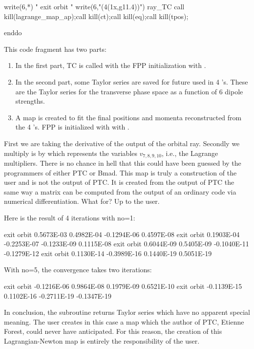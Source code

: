 \documentclass{hitec}     %
\begin{document}
{{\begin{code}
   write(6,*) " exit orbit " 
   write(6,"(4(1x,g11.4))") ray_TC%
   call kill(lagrange_map_ap);call kill(ct);call kill(eq);call kill(tpos);

enddo
\end{code}

This code fragment has two parts:
\begin{enumerate}
\item\label{itf1} In the  first part, TC is called with the FPP initialization  with . 
\item\label{itf2}  In the  second part,  some Taylor series are saved for future used in 4 's. These are the Taylor series for the transverse phase space as a function of 6 dipole strengths.
\item\label{itf3}  A map is created to fit the final positions and momenta reconstructed from the  4 's. FPP is initialized with with . 
\end{enumerate}



First we are taking the derivative of the output of the orbital ray.  
 Secondly we multiply is by  which represents the variables $v_{7,8,9,10}$, i.e., the Lagrange multipliers. There is no chance in hell that this could have been guessed by the  programmers of either PTC or Bmad. This map is truly a construction of the user and is not the output of PTC. It is created from the output of PTC the same way a matrix can be computed from the output of an ordinary  code via numerical differentiation.  What for? Up to the user.
 

Here is the result of 4 iterations with no=1:
\renewcommand{\codefont}{\footnotesize}
\begin{code}
  exit orbit
  0.5673E-03  0.4982E-04 -0.1294E-06  0.4597E-08
  exit orbit
  0.1903E-04 -0.2253E-07 -0.1233E-09  0.1115E-08
  exit orbit
  0.6044E-09  0.5405E-09 -0.1040E-11 -0.1279E-12
  exit orbit
  0.1130E-14 -0.3989E-16  0.1440E-19  0.5051E-19
  \end{code}
  
  With no=5, the convergence takes two iterations:
  \begin{code}
  exit orbit
 -0.1216E-06  0.9864E-08  0.1979E-09  0.6521E-10
  exit orbit
 -0.1139E-15  0.1102E-16 -0.2711E-19 -0.1347E-19
 \end{code}
  \renewcommand{\codefont}{\small}
  
  In conclusion, the subroutine  returns Taylor series which have no apparent  special meaning. The user creates in this case a map which the author of PTC, Etienne Forest, could never have anticipated. For this reason, the creation of this Lagrangian-Newton map is entirely the responsibility of the user.
  
}}
\end{document}
